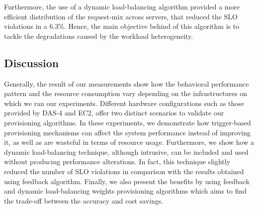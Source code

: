 Furthermore, the use of a dynamic load-balancing algorithm provided a more efficient distribution of the request-mix across servers, that reduced the SLO violations in a 6.3\%. Hence, the main objective behind of this algorithm is to tackle the degradations caused by the workload heterogeneity.


	


\subsection*{Discussion}



Generally, the result of our measurements show how the behavioral performance pattern and the resource consumption vary depending on the infrastructures on which we ran our experiments. Different hardware configurations such as those provided by DAS-4 and EC2, offer two distinct scenarios to validate our provisioning algorithms.  In these experiments, we demonstrate how trigger-based provisioning mechanisms can affect the system performance instead of improving it, as well as are wasteful in terms of resource usage. Furthermore, we show how a dynamic load-balancing technique, although intrusive, can be included and used without producing performance alterations. In fact, this technique slightly reduced the number of SLO violations in comparison with the results obtained using feedback algorithm. Finally, we also present the benefits by using feedback and dynamic load-balancing weights provisioning algorithms which aims to find the trade-off between the accuracy and cost savings. 

